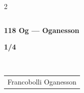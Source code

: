 \documentclass[10pt,a4paper]{article}
\newcommand{\samplebadge}[1]{\hspace{0.35em}\colorbox{yellow!30}{\strut\textbf{#1}}}
\newcommand{\sampledot}[1]{\textcolor[HTML]{#1}{\large\textbullet}}
\begin{document}
\begin{multicols}{2}
\begin{minipage}[t]{\linewidth}
\begin{tabularx}{\linewidth}{@{}X@{}}
\end{tabularx}
\vspace{0.2em}
\end{minipage}
\begin{minipage}[t]{\linewidth}
\textbf{118 Og — Oganesson}\samplebadge{1/4}\\
\begin{tabularx}{\linewidth}{@{}X@{}}
\sampledot{ffda66} Francobolli Oganesson \\
\end{tabularx}
\vspace{0.2em}
\end{minipage}
\end{multicols}
\end{document}
